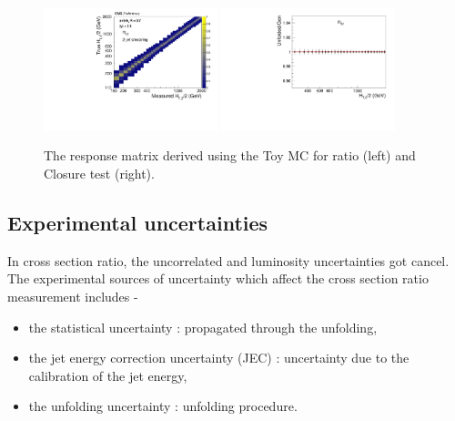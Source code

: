 \begin{figure}[!htbp]
  \begin{center}
    \includegraphics[width=0.45\textwidth]{Plots_HT_2_150/Normalized_Response_Matrix_NLO_ratio_32_column_2.pdf}
    \includegraphics[width=0.45\textwidth]{Plots_HT_2_150/Ratio_Unfolding_NLO_Ratio_32_ToyMC.pdf}\\
    \caption{The response matrix derived using the Toy MC for ratio \ratio (left) and Closure test (right).}%
    \label{fig:unfolded_ratio}
  \end{center}
\end{figure}

\subsection{Experimental uncertainties}
In cross section ratio, the uncorrelated and luminosity uncertainties got cancel. The experimental sources of uncertainty which affect the cross section ratio measurement includes - 

\begin{itemize}
\item the statistical uncertainty : propagated through the unfolding, 
\item the jet energy correction uncertainty (JEC) : uncertainty due to the calibration of the jet energy, 
\item the unfolding uncertainty : unfolding procedure.
\end{itemize}


